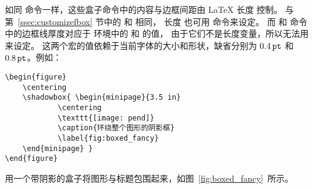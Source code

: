 如同  命令一样，这些盒子命令中的内容与边框间距由 \LaTeX{} 长度  控制。
与第~\ref{ssec:customizefbox} 节中的  和  相同，
长度  也可用  命令来设定。
而  和  命令中的边框线厚度对应于  环境中的  和  的值，
由于它们不是长度变量，所以无法用  来设定。
这两个宏的值依赖于当前字体的大小和形状，缺省分别为 $0.4\,\mathtt{pt}$ 和 $0.8\,\mathtt{pt}$。例如：
\begin{lstlisting}
\begin{figure}
	\centering
	\shadowbox{ \begin{minipage}{3.5 in}
			\centering
			\texttt{[image: pend]}
			\caption{环绕整个图形的阴影框}
			\label{fig:boxed_fancy}
	\end{minipage} }
\end{figure}
\end{lstlisting}
用一个带阴影的盒子将图形与标题包围起来，如图~\ref{fig:boxed_fancy}~所示。

\begin{figure}
	\centering
\end{figure}


\endinput